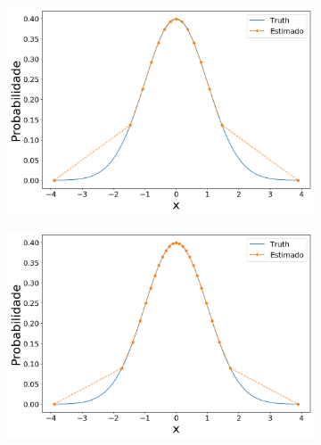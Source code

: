 \begin{figure}[H]
	\centering
	\begin{subfigure}[b]{0.45\textwidth}
		\centering 
		\includegraphics[width=\linewidth]{./figuras/CDFm_normal_15}
		\caption{}
		\label{fig:cdfnorm15}
	\end{subfigure}
	\hfill
	\begin{subfigure}[b]{0.45\textwidth}
		\centering 
		\includegraphics[width=\linewidth]{./figuras/CDFm_normal_25}
		\caption{}
		\label{fig:cdfnorm25}
	\end{subfigure}
	

\end{figure}
